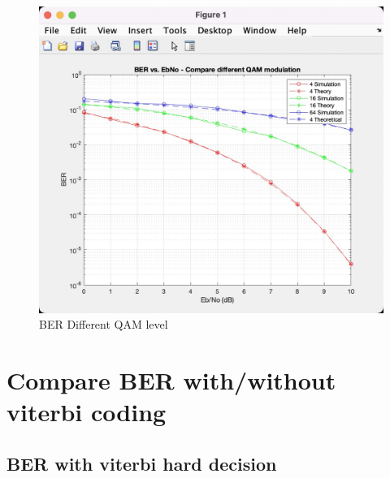 \documentclass[12pt]{article}
\begin{document}




\begin{figure}[ht]
    \includegraphics[width=\textwidth]{qam}
    \caption{BER Different QAM level}
\end{figure}

\section{Compare BER with/without viterbi coding}
\subsection{BER with viterbi hard decision}



\clearpage
\end{document}

